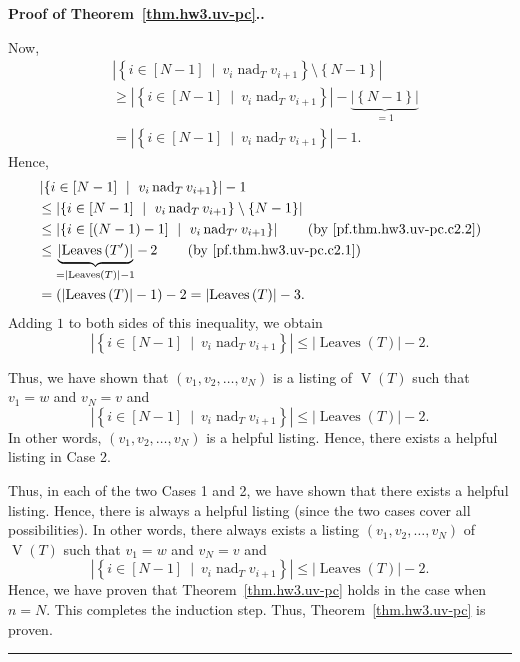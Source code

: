 \documentclass[numbers=enddot,12pt,final,onecolumn,notitlepage]{scrartcl}%
\theoremstyle{definition}
\newenvironment{proof}[1][Proof]{\noindent\textbf{#1.} }{\ \rule{0.5em}{0.5em}}
\newcommand{\set}[1]{\left\{ #1 \right\}}
\newcommand{\abs}[1]{\left| #1 \right|}
\newcommand{\tup}[1]{\left( #1 \right)}
\newcommand{\ive}[1]{\left[ #1 \right]}
\newcommand{\verts}[1]{\operatorname{V}\left( #1 \right)}
\newcommand{\leaves}[1]{\operatorname{Leaves}\left( #1 \right)}
\begin{document}
\begin{proof}[Proof of Theorem~\ref{thm.hw3.uv-pc}.]
\begin{itemize}
        Now,
        \begin{align*}
        &\abs{\set{i \in \ive{N-1} \ \mid \ v_i \operatorname{nad}_T v_{i+1} }
             \setminus \set{N-1}} \\
        &\geq \abs{\set{i \in \ive{N-1} \ \mid \ v_i \operatorname{nad}_T v_{i+1} }}
         - \underbrace{\abs{\set{N-1}}}_{= 1} \\
        &= \abs{\set{i \in \ive{N-1} \ \mid \ v_i \operatorname{nad}_T v_{i+1} }} - 1 .
        \end{align*}
        Hence, %
        \begin{align*}
        &\abs{\set{i \in \ive{N-1} \ \mid \ v_i \operatorname{nad}_T v_{i+1} }} - 1 \\
        &\leq \abs{\set{i \in \ive{N-1} \ \mid \ v_i \operatorname{nad}_T v_{i+1} }
             \setminus \set{N-1}} \\
        &\leq
        \abs{\set{i \in \ive{\tup{N-1}-1} \ \mid \ v_i \operatorname{nad}_{T'} v_{i+1} }}
        \qquad \left(\text{by \eqref{pf.thm.hw3.uv-pc.c2.2}}\right)
        \\
        &\leq
        \underbrace{\abs{\leaves{T'}}}_{= \abs{\leaves{T}} - 1} -\, 2
        \qquad \left(\text{by \eqref{pf.thm.hw3.uv-pc.c2.1}}\right) \\
        &= \tup{\abs{\leaves{T}} - 1} - 2 = \abs{\leaves{T}} - 3.
        \end{align*}
        Adding $1$ to both sides of this inequality, we obtain
        \[
        \abs{\set{i \in \ive{N-1} \ \mid \ v_i \operatorname{nad}_T v_{i+1} }}
        \leq \abs{\leaves{T}} - 2 .
        \]
        
        Thus, we have shown that $\tup{v_1, v_2, \ldots, v_N}$ is a
        listing of $\verts{T}$ such that $v_1 = w$ and $v_N = v$ and
        \[
        \abs{\set{i \in \ive{N-1} \ \mid \ v_i \operatorname{nad}_T v_{i+1} }}
        \leq \abs{\leaves{T}} - 2.
        \]
        In other words, $\tup{v_1, v_2, \ldots, v_N}$ is a helpful
        listing.
        Hence, there exists a helpful listing in Case 2.
\end{itemize}

Thus, in each of the two Cases 1 and 2, we have shown that there
exists a helpful listing.
Hence, there is always a helpful listing (since the two cases cover
all possibilities).
In other words, there always exists a listing
$\tup{v_1, v_2, \ldots, v_N}$ of
$\verts{T}$ such that $v_1 = w$ and $v_N = v$ and
\[
\abs{\set{i \in \ive{N-1} \ \mid \ v_i \operatorname{nad}_T v_{i+1} }}
\leq \abs{\leaves{T}} - 2.
\]
Hence, we have proven that Theorem~\ref{thm.hw3.uv-pc} holds in the
case when $n = N$.
This completes the induction step.
Thus, Theorem~\ref{thm.hw3.uv-pc} is proven.
\end{proof}
\end{document}
